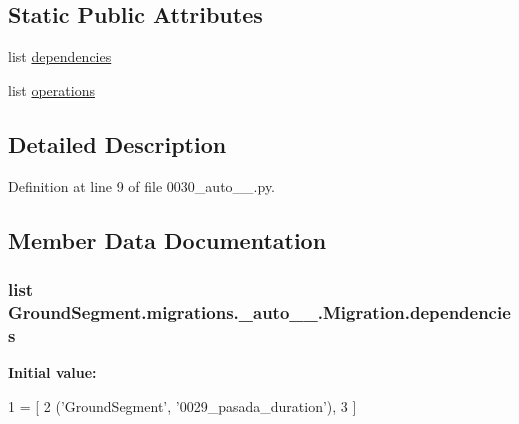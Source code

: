 \subsection*{Static Public Attributes}
\begin{DoxyCompactItemize}
\item 
list \hyperlink{class_ground_segment_1_1migrations_1_10030__auto__20170125__1955_1_1_migration_ab326e8a19320df8ed5a25b926a7e0592}{dependencies}
\item 
list \hyperlink{class_ground_segment_1_1migrations_1_10030__auto__20170125__1955_1_1_migration_a1057b51df665a31780a95e62bc1f8fd4}{operations}
\end{DoxyCompactItemize}


\subsection{Detailed Description}


Definition at line 9 of file 0030\+\_\+auto\+\_\+\_.\+py.



\subsection{Member Data Documentation}
\hypertarget{class_ground_segment_1_1migrations_1_10030__auto__20170125__1955_1_1_migration_ab326e8a19320df8ed5a25b926a7e0592}{}
\subsubsection[{dependencies}]{\setlength{\rightskip}{0pt plus 5cm}list Ground\+Segment.\+migrations.\+\_\+auto\+\_\+\_.\+Migration.\+dependencies\hspace{0.3cm}{\ttfamily [static]}}\label{class_ground_segment_1_1migrations_1_10030__auto__20170125__1955_1_1_migration_ab326e8a19320df8ed5a25b926a7e0592}
{\bfseries Initial value\+:}
\begin{DoxyCode}
1 = [
2         (\textcolor{stringliteral}{'GroundSegment'}, \textcolor{stringliteral}{'0029\_pasada\_duration'}),
3     ]
\end{DoxyCode}


